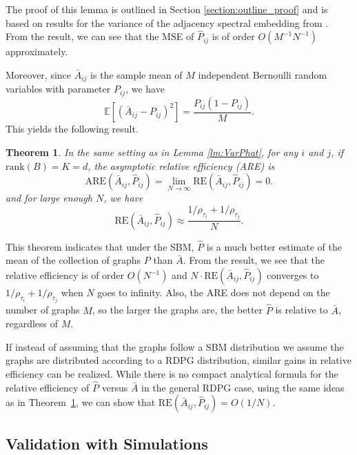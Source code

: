 \documentclass[a4paper]{article}
\newtheorem{theorem}[fact]{Theorem}
\newcommand{\Ex}{\mathbb{E}}
\begin{document}
The proof of this lemma is outlined in Section \ref{section:outline_proof} and is based on results for the variance of the adjacency spectral embedding from \citet{athreya2013limit}. From the result, we can see that the MSE of $\hat{P}_{ij}$ is of order $O(M^{-1}N^{-1})$ approximately.

Moreover, since $\bar{A}_{ij}$ is the sample mean of $M$ independent Bernoulli random variables with parameter $P_{ij}$, we have
\[
	\Ex[(\bar{A}_{ij} - P_{ij})^2] = \frac{P_{ij}(1-P_{ij})}{M}.
\]
This yields the following result.
\begin{theorem}
\label{thm:ARE}
In the same setting as in Lemma \ref{lm:VarPhat}, for any $i$ and $j$, if $\mathrm{rank}(B)=K=d$, the asymptotic relative efficiency (ARE) is 
\[
	\mathrm{ARE}(\bar{A}_{ij}, \hat{P}_{ij}) = \lim_{N \to \infty} \mathrm{RE}(\bar{A}_{ij}, \hat{P}_{ij}) = 0.
\]
and for large enough $N$, we have
\[
	\mathrm{RE}(\bar{A}_{ij}, \hat{P}_{ij}) \approx
    \frac{1/\rho_{\tau_i} + 1/\rho_{\tau_j}}{N}.
\]
\end{theorem}

This theorem indicates that under the SBM, $\hat{P}$ is a much better estimate of the mean of the collection of graphs $P$ than $\bar{A}$. 
From the result, we see that the relative efficiency is of order $O(N^{-1})$ and $N \cdot \mathrm{RE}(\bar{A}_{ij}, \hat{P}_{ij})$ converges to $1/\rho_{\tau_i}+1/\rho_{\tau_j}$ when $N$ goes to infinity.
Also, the ARE does not depend on the number of graphs $M$, so the larger the graphs are, the better $\hat{P}$ is relative to $\bar{A}$, regardless of $M$.

If instead of assuming that the graphs follow a SBM distribution we assume the graphs are distributed according to a RDPG distribution, similar gains in relative efficiency can be realized.
While there is no compact analytical formula for the relative efficiency of $\hat{P}$ versus $\bar{A}$ in the general RDPG case, using the same ideas as in Theorem~\ref{thm:ARE}, we can show that $\mathrm{RE}(\bar{A}_{ij},\hat{P}_{ij}) = O(1/N)$.

\subsection{Validation with Simulations}\label{sec:sbm_sim}
\end{document}
